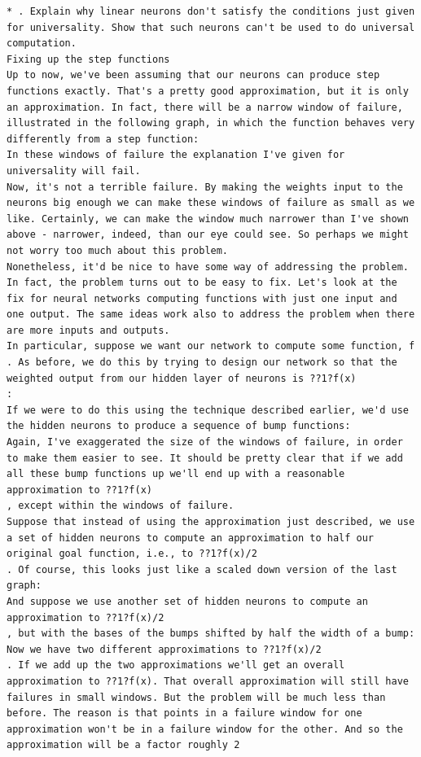 \begin{lstlisting}
* . Explain why linear neurons don't satisfy the conditions just given for universality. Show that such neurons can't be used to do universal computation. 
Fixing up the step functions
Up to now, we've been assuming that our neurons can produce step functions exactly. That's a pretty good approximation, but it is only an approximation. In fact, there will be a narrow window of failure, illustrated in the following graph, in which the function behaves very differently from a step function:
In these windows of failure the explanation I've given for universality will fail.
Now, it's not a terrible failure. By making the weights input to the neurons big enough we can make these windows of failure as small as we like. Certainly, we can make the window much narrower than I've shown above - narrower, indeed, than our eye could see. So perhaps we might not worry too much about this problem.
Nonetheless, it'd be nice to have some way of addressing the problem.
In fact, the problem turns out to be easy to fix. Let's look at the fix for neural networks computing functions with just one input and one output. The same ideas work also to address the problem when there are more inputs and outputs.
In particular, suppose we want our network to compute some function, f
. As before, we do this by trying to design our network so that the weighted output from our hidden layer of neurons is ??1?f(x)
:
If we were to do this using the technique described earlier, we'd use the hidden neurons to produce a sequence of bump functions:
Again, I've exaggerated the size of the windows of failure, in order to make them easier to see. It should be pretty clear that if we add all these bump functions up we'll end up with a reasonable approximation to ??1?f(x)
, except within the windows of failure.
Suppose that instead of using the approximation just described, we use a set of hidden neurons to compute an approximation to half our original goal function, i.e., to ??1?f(x)/2
. Of course, this looks just like a scaled down version of the last graph:
And suppose we use another set of hidden neurons to compute an approximation to ??1?f(x)/2
, but with the bases of the bumps shifted by half the width of a bump:
Now we have two different approximations to ??1?f(x)/2
. If we add up the two approximations we'll get an overall approximation to ??1?f(x). That overall approximation will still have failures in small windows. But the problem will be much less than before. The reason is that points in a failure window for one approximation won't be in a failure window for the other. And so the approximation will be a factor roughly 2

\end{lstlisting}

